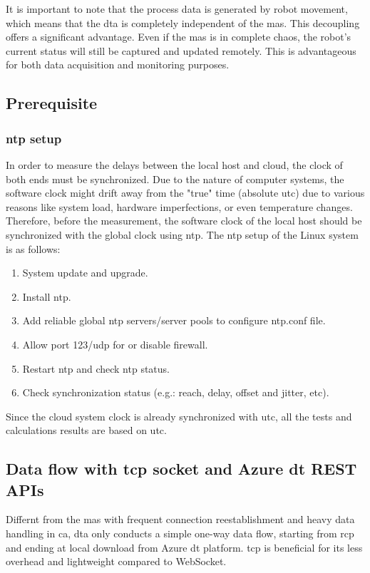 It is important to note that the process data is generated by robot movement, 
which means that the \gls{dta} is completely independent of the \gls{mas}. This decoupling 
offers a 
significant advantage. Even if the \gls{mas} is in complete chaos, the robot's current status 
will still be captured and updated remotely. This is advantageous for both data acquisition 
and monitoring purposes.



\subsection{Prerequisite} \label{chap: ntpsetup}
\subsubsection{\gls{ntp} setup}
In order to measure the delays between the local host and cloud, the clock of both ends must be synchronized. 
Due to the nature of computer systems, the software clock might drift away from the "true" time (absolute \gls{utc}) 
due to various reasons like system load, hardware imperfections, or even temperature changes.
Therefore, before the measurement, the software clock of the local host should be synchronized with the global 
clock using \gls{ntp}. 
The \gls{ntp} setup of the Linux system is as follows:  

\begin{enumerate}
    \item System update and upgrade.
    \item Install \gls{ntp}.
    \item Add reliable global \gls{ntp} servers/server pools to configure ntp.conf file.
    \item Allow port 123/udp for or disable firewall.
    \item Restart \gls{ntp} and check \gls{ntp} status.
    \item Check synchronization status (e.g.: reach, delay, offset and jitter, etc).
    \end{enumerate}

Since the cloud system clock is already synchronized with \gls{utc}, all the tests and calculations results are based on \gls{utc}. 

\subsection{Data flow with \gls{tcp} socket and Azure \gls{dt} REST APIs}\label{chap: RCPTCP-DTAPI}
Differnt from the \gls{mas} with frequent connection reestablishment and heavy data handling in \gls{ca}, 
\gls{dta} only conducts a simple one-way data flow, starting from \gls{rcp} and 
ending at local download from Azure \gls{dt} platform. \gls{tcp} is beneficial for 
its less overhead and lightweight compared to WebSocket. 


